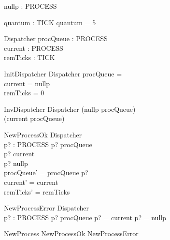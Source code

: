 
\begin{axdef}
    nullp : PROCESS
\end{axdef}

\begin{axdef}
    quantum : TICK
\where
    quantum = 5
\end{axdef}

\begin{schema}{Dispatcher}
    procQueue : \seq PROCESS \\
    current : PROCESS \\
    remTicks : TICK
\end{schema}

\begin{schema}{InitDispatcher}
    Dispatcher
\where
    procQueue = \langle \rangle \\
    current = nullp \\
    remTicks = 0
\end{schema}

\begin{schema}{InvDispatcher}
    Dispatcher
\where
	\lnot (\langle nullp \rangle \inseq procQueue) \\
	\lnot (\langle current \rangle \inseq procQueue)
\end{schema}

\begin{schema}{NewProcessOk}
    \Delta Dispatcher \\
    p? : PROCESS
\where
    p? \notin \ran procQueue \\
    p? \neq current \\
    p? \neq nullp \\
    procQueue' = procQueue \cat \langle p? \rangle \\
    current' = current \\
    remTicks' = remTicks
\end{schema}

\begin{schema}{NewProcessError}
    \Xi Dispatcher \\
    p? : PROCESS
\where
    p? \in \ran procQueue \lor p? = current \lor p? = nullp \\
\end{schema}

\begin{zed}
    NewProcess  NewProcessOk \lor NewProcessError
\end{zed}

